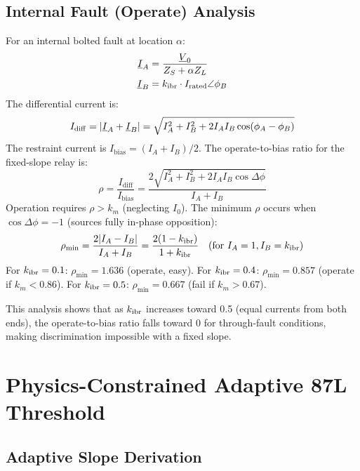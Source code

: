 \subsection{Internal Fault (Operate) Analysis}

For an internal bolted fault at location $\alpha$:
\begin{align}
  \underline{I}_A &= \frac{\underline{V}_0}{Z_S + \alpha Z_L}
  \label{eq:ch4_ia_fault} \\
  \underline{I}_B &= k_{\mathrm{ibr}} \cdot I_\mathrm{rated} \angle \phi_B
  \label{eq:ch4_ib_ibr}
\end{align}
The differential current is:
\begin{equation}
  I_\mathrm{diff} = |\underline{I}_A + \underline{I}_B|
    = \sqrt{I_A^2 + I_B^2 + 2I_A I_B \cos(\phi_A - \phi_B)}
  \label{eq:ch4_idiff_fault}
\end{equation}
The restraint current is $I_\mathrm{bias} = (I_A + I_B)/2$.
The operate-to-bias ratio for the fixed-slope relay is:
\begin{equation}
  \rho = \frac{I_\mathrm{diff}}{I_\mathrm{bias}} =
  \frac{2\sqrt{I_A^2 + I_B^2 + 2I_A I_B \cos\Delta\phi}}{I_A + I_B}
  \label{eq:ch4_rho}
\end{equation}
Operation requires $\rho > k_m$ (neglecting $I_0$). The minimum $\rho$
occurs when $\cos\Delta\phi = -1$ (sources fully in-phase opposition):
\begin{equation}
  \rho_\mathrm{min} = \frac{2|I_A - I_B|}{I_A + I_B}
  = \frac{2(1 - k_{\mathrm{ibr}})}{1 + k_{\mathrm{ibr}}} \quad (\text{for }I_A = 1, I_B = k_{\mathrm{ibr}})
  \label{eq:ch4_rho_min}
\end{equation}
For $k_{\mathrm{ibr}} = 0.1$: $\rho_\mathrm{min} = 1.636$ (operate, easy).
For $k_{\mathrm{ibr}} = 0.4$: $\rho_\mathrm{min} = 0.857$ (operate if $k_m < 0.86$).
For $k_{\mathrm{ibr}} = 0.5$: $\rho_\mathrm{min} = 0.667$ (fail if $k_m > 0.67$).

This analysis shows that as $k_{\mathrm{ibr}}$ increases toward 0.5 (equal currents
from both ends), the operate-to-bias ratio falls toward 0 for through-fault
conditions, making discrimination impossible with a fixed slope.

\section{Physics-Constrained Adaptive 87L Threshold}
\label{sec:ch4_adaptive}

\subsection{Adaptive Slope Derivation}

